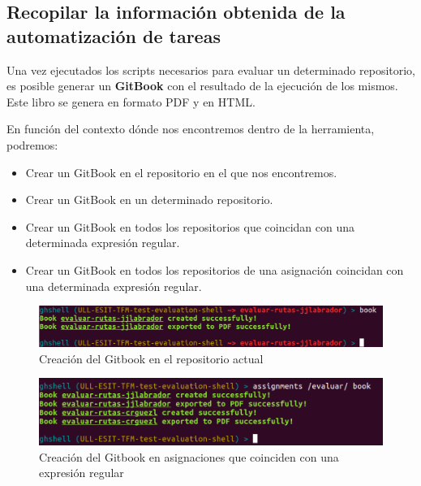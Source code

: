\subsection{Recopilar la información obtenida de la automatización de tareas}
\label{subsec:3.1.4}

    Una vez ejecutados los scripts necesarios para evaluar un determinado repositorio, es posible generar un {\bfseries GitBook} con el resultado de la ejecución de los mismos. Este libro se genera en formato PDF y en HTML.
\bigskip
    
    En función del contexto dónde nos encontremos dentro de la herramienta, podremos:
    \begin{itemize}
    	\item Crear un GitBook en el repositorio en el que nos encontremos.
    	\item Crear un GitBook en un determinado repositorio.
	    \item Crear un GitBook en todos los repositorios que coincidan con una determinada expresión regular.
	    \item Crear un GitBook en todos los repositorios de una asignación coincidan con una determinada expresión regular.
    \end{itemize}
        
        \begin{figure}[H]
		\begin{center}
		\includegraphics[width=1\textwidth]{images/ghshell8-3}
		\caption{Creación del Gitbook en el repositorio actual}
		\label{fig:ghshell8-3}
		\end{center}
		\end{figure}
		
        \begin{figure}[H]
		\begin{center}
		\includegraphics[width=1\textwidth]{images/ghshell8-1}
		\caption{Creación del Gitbook en asignaciones que coinciden con una expresión regular}
		\label{fig:ghshell8-1}
		\end{center}
		\end{figure}	
		
